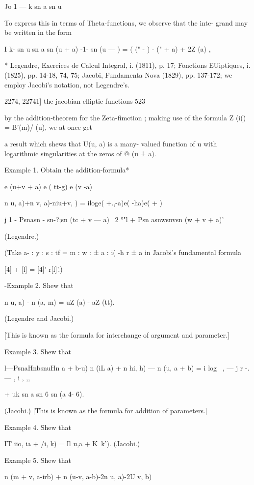   Jo 1 — k  sn  a sn  u 

To express this in terms of Theta-functions, we observe that the inte- 
grand may be written in the form 

I k- sn u sn a  sn (u + a) -1- sn (u —  )  =   (  (" -  ) -   (" + a) + 2Z (a) , 

* Legendre, Exercices de Calcul Integral, i. (1811), p. 17; Fonctions EUiptiques, i. (1825), 
pp. 14-18, 74, 75; Jacobi, Fundamenta Nova (1829), pp. 137-172; we employ Jacobi's notation, 
not Legendre's. 



2274, 22741] the jacobian elliptic functions 523 

by the addition-theorem for the Zeta-fimction ; making use of the formula 
Z (i() = B'(m)/  (u), we at once get 

a result which shews that U(u, a) is a many- valued function of u with 
logarithmic singularities at the zeros of @ (u ± a). 

Example 1. Obtain the addition-formula* 

e (u+v + a) e ( tt-g) e (v -a) 

n u, a)+n v, a)-niu+v,  ) = iloge( +.,-a)e( -ha)e( + ) 

j  1 - Psnasn - sn-?;sn (tc + v — a) 
~2 °"l + Psn asnwsnvsn (w + v + a)' 

(Legendre.) 

(Take a- : y : s : tf = m : w : ± a : i( -h r ± a in Jacobi's fundamental formula 

[4] + [l] = [4]'-r[l]'.) 

-Example 2. Shew that 

n  u, a) - n (a, m) = uZ (a) - aZ (tt). 

(Legendre and Jacobi.) 

[This is known as the formula for interchange of argument and parameter.] 

Example 3. Shew that 

l—PsnaHnbsnuHn a + b-u) 
n (iL a) + n hi, h) — n (u, a + b) = i log \ , — j  r -. — , i , ,,\ 

+ uk  sn a sn 6 sn (a 4- 6). 

(Jacobi.) 
[This is known as the formula for addition of parameters.] 

Example 4. Shew that 

IT  iio, ia + /i, k) = Il u,a + K\ k'). (Jacobi.) 

Example 5. Shew that 

n (m + v, a-irb) + n (u-v, a-b)-2n u, a)-2U v, b) 

